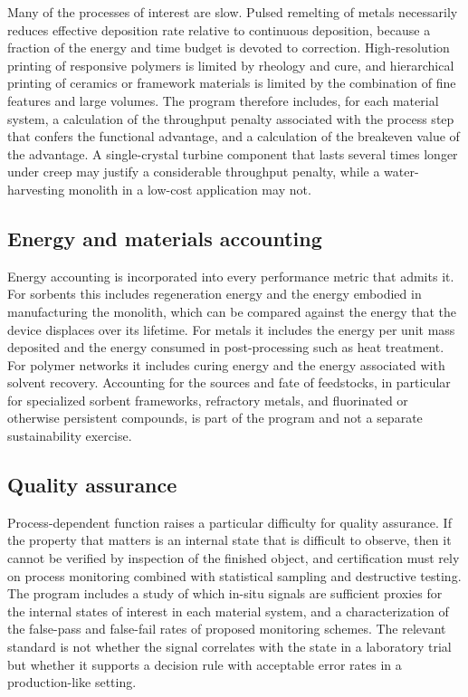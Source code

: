 \documentclass[11pt]{article}
\theoremstyle{definition}
\begin{document}
Many of the processes of interest are slow. Pulsed remelting of metals necessarily reduces effective deposition rate relative to continuous deposition, because a fraction of the energy and time budget is devoted to correction. High-resolution printing of responsive polymers is limited by rheology and cure, and hierarchical printing of ceramics or framework materials is limited by the combination of fine features and large volumes. The program therefore includes, for each material system, a calculation of the throughput penalty associated with the process step that confers the functional advantage, and a calculation of the breakeven value of the advantage. A single-crystal turbine component that lasts several times longer under creep may justify a considerable throughput penalty, while a water-harvesting monolith in a low-cost application may not.

\subsection{Energy and materials accounting}

Energy accounting is incorporated into every performance metric that admits it. For sorbents this includes regeneration energy and the energy embodied in manufacturing the monolith, which can be compared against the energy that the device displaces over its lifetime. For metals it includes the energy per unit mass deposited and the energy consumed in post-processing such as heat treatment. For polymer networks it includes curing energy and the energy associated with solvent recovery. Accounting for the sources and fate of feedstocks, in particular for specialized sorbent frameworks, refractory metals, and fluorinated or otherwise persistent compounds, is part of the program and not a separate sustainability exercise.

\subsection{Quality assurance}

Process-dependent function raises a particular difficulty for quality assurance. If the property that matters is an internal state that is difficult to observe, then it cannot be verified by inspection of the finished object, and certification must rely on process monitoring combined with statistical sampling and destructive testing. The program includes a study of which in-situ signals are sufficient proxies for the internal states of interest in each material system, and a characterization of the false-pass and false-fail rates of proposed monitoring schemes. The relevant standard is not whether the signal correlates with the state in a laboratory trial but whether it supports a decision rule with acceptable error rates in a production-like setting.
\end{document}
